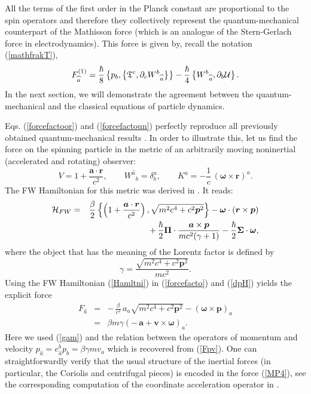 \documentclass[preprint,showpacs,preprintnumbers,eqsecnum,amsmath,amssymb]{revtex4-1}
\begin{document}
All the terms of the first order in the Planck constant %
are proportional to the spin operators and therefore they collectively
represent the quantum-mechanical counterpart of the Mathisson force
(which is an analogue of the Stern-Gerlach force in electrodynamics).
This force is given by, recall the notation (\ref{mathfrakT}),
\begin{equation}
 F_{\widehat a}^{(1)} = {\frac \hbar8} \left\{p_b,\left\{\mathfrak{T}^c,
\partial_cW^b{}_{\widehat a}\right\}\right\} - {\frac \hbar4}\left\{
W^b{}_{\widehat a},\partial_b{\cal U}\right\}.\label{forcefactoun}
\end{equation}
In the next section, we will demonstrate the agreement between the
quantum-mechanical and the classical equations of particle dynamics.

Eqs. (\ref{forcefactoor}) and (\ref{forcefactoun}) perfectly reproduce all 
previously obtained quantum-mechanical results \cite{PRD,PRD2,OST,ostrong}. 
In order to illustrate this, let us find the force on the spinning particle 
in the metric \cite{HN} of an arbitrarily moving noninertial (accelerated 
and rotating) observer:
\begin{equation}
V = 1 + {\frac {{\bm a}\cdot{\bm r}}{c^2}},\qquad W^{\widehat
a}{}_b = \delta^a_b,\qquad K^a =-{\frac 1c}\,(\bm\omega\times\bm
r)^a.\label{VWni}
\end{equation}
The FW Hamiltonian for this metric was derived in \cite{ostrong}. It reads: 
\begin{eqnarray}
{\cal H}_{FW} &=& \frac\beta2\left\{\left(1+\frac{\bm a\cdot\bm r}{c^2}\right),
\sqrt{m^2c^4+c^2\bm p^2}\right\}-\bm\omega\cdot({\bm r}\times{\bm p})\nonumber\\
&& +\,\frac\hbar2\bm\Pi\cdot\frac{\bm a\times\bm p}{mc^2(\gamma+1)}
-\frac\hbar2\bm\Sigma\cdot\bm\omega,\label{Hamltni}
\end{eqnarray}
where the object that has the meaning of the Lorentz factor is defined by
\begin{equation}
\gamma = \frac{\sqrt{m^2c^4+c^2\bm p^2}}{mc^2}.\label{gam}
\end{equation}
Using the FW Hamiltonian (\ref{Hamltni}) in (\ref{forcefacto}) and (\ref{dpH})
yields the explicit force 
\begin{eqnarray}
F_{\widehat a} &=& -\,{\frac \beta{c^2}}\,a_a\sqrt{m^2c^4+c^2\bm p^2} 
- ({\bm\omega}\times{\bm p})_a\nonumber\\
&=& \beta m\gamma\left(-\,\bm{a} + \bm{v}\times\bm{\omega}\right)_a.\label{MP4}
\end{eqnarray}
Here we used (\ref{gam}) and the relation between the operators of momentum 
and velocity $p_{\widehat a} = e_{\widehat a}^bp_b = \beta\gamma m v_a$ which is 
recovered from (\ref{Fpv}). One can straightforwardly verify that the usual
structure of the inertial forces (in particular, the Coriolis and centrifugal 
pieces) is encoded in the force (\ref{MP4}), see the corresponding computation
of the coordinate acceleration operator in \cite{ostrong}. 
\end{document}
